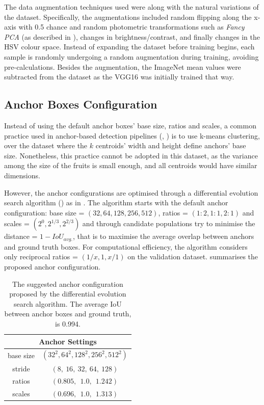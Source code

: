 The data augmentation techniques used were along with the natural variations of the dataset. Specifically, the augmentations included random flipping along the x-axis with 0.5 chance and random photometric transformations such as \textit{Fancy PCA} (as described in \cite{taylor2017improving}), changes in brightness/contrast, and finally changes in the HSV colour space. Instead of expanding the dataset before training begins, each sample is randomly undergoing a random augmentation during training, avoiding pre-calculations. Besides the augmentation, the ImageNet mean values were subtracted from the dataset as the VGG16 was initially trained that way.

\subsection{Anchor Boxes Configuration}
Instead of using the default anchor boxes' base size, ratios and scales, a common practice used in anchor-based detection pipelines (\cite{redmon2017yolo9000}, \cite{redmon2018yolov3}) is to use k-means clustering, over the dataset where the $k$ centroids' width and height define anchors' base size. Nonetheless, this practice cannot be adopted in this dataset, as the variance among the size of the fruits is small enough, and all centroids would have similar dimensions.

However, the anchor configurations are optimised through a differential evolution search algorithm (\cite{storn1997differential}) as in \cite{zlocha2019improving}. The algorithm starts with the default anchor configuration: base size = $(32, 64, 128, 256, 512)$, ratios = $(1\!:\!2, 1\!:\!1, 2\!:\!1)$ and scales = $(2^{0}, 2^{1/3}, 2^{2/3})$ and through candidate populations try to minimise the distance = $1 - IoU_{avg.}$, that is to maximise the average overlap between anchors and ground truth boxes. For computational efficiency, the algorithm considers only reciprocal ratios = $(1/x, 1, x/1)$ on the validation dataset.  summarises the proposed anchor configuration. \\

\begin{table}[!htb]
  \centering
  \begin{tabular}{cc}
  \toprule
  \multicolumn{2}{c}{\textbf{Anchor Settings}} \\
  \midrule
base size	& 	$(32^2, 64^2, 128^2, 256^2, 512^2)$ \\
stride 	& 	$(8, \ 16, \ 32, \ 64, \ 128)$ \\
ratios  	&	$(0.805, \ \ 1.0, \ \ 1.242)$ \\
scales  	& 	$(0.696, \ \ 1.0, \ \ 1.313)$ \\
  \bottomrule
  \end{tabular}
  \caption{The suggested anchor configuration proposed by the differential evolution search algorithm. The average IoU between anchor boxes and ground truth, is 0.994.}
  \label{tab2}
\end{table}

